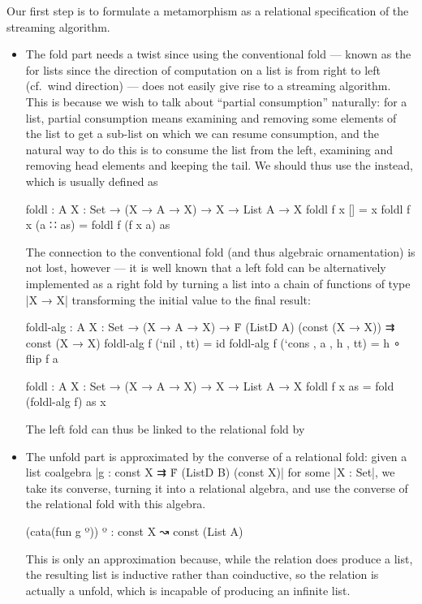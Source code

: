Our first step is to formulate a metamorphism as a relational specification of the streaming algorithm.
\begin{itemize}
\item The fold part needs a twist since using the conventional fold --- known as the  for lists since the direction of computation on a list is from right to left (cf.~wind direction) --- does not easily give rise to a streaming algorithm.
This is because we wish to talk about ``partial consumption'' naturally: for a list, partial consumption means examining and removing some elements of the list to get a sub-list on which we can resume consumption, and the natural way to do this is to consume the list from the left, examining and removing head elements and keeping the tail.
We should thus use the  instead, which is usually defined as
\begin{code}
foldl : {A X : Set} → (X → A → X) → X → List A → X
foldl f x []        = x
foldl f x (a ∷ as)  = foldl f (f x a) as
\end{code}
The connection to the conventional fold (and thus algebraic ornamentation) is not lost, however --- it is well known that a left fold can be alternatively implemented as a right fold by turning a list into a chain of functions of type |X → X| transforming the initial value to the final result:
\begin{code}
foldl-alg :  {A X : Set} → (X → A → X) →
             Ḟ (ListD A) (const (X → X)) ⇉ const (X → X)
foldl-alg f (`nil   ,          tt) = id
foldl-alg f (`cons  , a , h ,  tt) = h ∘ flip f a

foldl : {A X : Set} → (X → A → X) → X → List A → X
foldl f x as = fold (foldl-alg f) as x
\end{code}
The left fold can thus be linked to the relational fold by
\item The unfold part is approximated by the converse of a relational fold: given a list coalgebra |g : const X ⇉ Ḟ (ListD B) (const X)| for some |X : Set|, we take its converse, turning it into a relational algebra, and use the converse of the relational fold with this algebra.
\begin{code}
(cata(fun g º)) º : const X ↝ const (List A)
\end{code}
This is only an approximation because, while the relation does produce a list, the resulting list is inductive rather than coinductive, so the relation is actually a  unfold, which is incapable of producing an infinite list.
\end{itemize}
